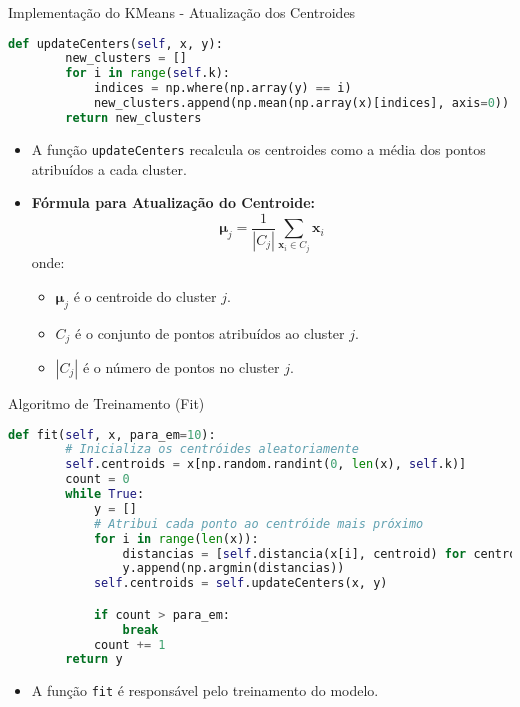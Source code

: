\documentclass{beamer}
\begin{document}
\begin{frame}[fragile]{Implementação do KMeans - Atualização dos Centroides}
\begin{lstlisting}[language=Python]
    def updateCenters(self, x, y):
        new_clusters = []
        for i in range(self.k):
            indices = np.where(np.array(y) == i)
            new_clusters.append(np.mean(np.array(x)[indices], axis=0))
        return new_clusters
\end{lstlisting}
    \vspace{0.3cm}
    \begin{itemize}
        \item A função \texttt{updateCenters} recalcula os centroides como a média dos pontos atribuídos a cada cluster.
    \end{itemize}
    \vspace{0.3cm}
    \begin{itemize}
        \item \textbf{Fórmula para Atualização do Centroide:}
        \[
        \mathbf{\mu}_j = \frac{1}{|C_j|} \sum_{\mathbf{x}_i \in C_j} \mathbf{x}_i
        \]
        onde:
        \begin{itemize}
            \item \( \mathbf{\mu}_j \) é o centroide do cluster \( j \).
            \item \( C_j \) é o conjunto de pontos atribuídos ao cluster \( j \).
            \item \( |C_j| \) é o número de pontos no cluster \( j \).
        \end{itemize}
    \end{itemize}
\end{frame}

\begin{frame}[fragile]{Algoritmo de Treinamento (Fit)}
\begin{lstlisting}[language=Python]
    def fit(self, x, para_em=10):
        # Inicializa os centróides aleatoriamente
        self.centroids = x[np.random.randint(0, len(x), self.k)]
        count = 0
        while True:
            y = []
            # Atribui cada ponto ao centróide mais próximo
            for i in range(len(x)):
                distancias = [self.distancia(x[i], centroid) for centroid in self.centroids]
                y.append(np.argmin(distancias))
            self.centroids = self.updateCenters(x, y)

            if count > para_em:
                break
            count += 1
        return y
\end{lstlisting}
    \vspace{0.3cm}
    \begin{itemize}
        \item A função \texttt{fit} é responsável pelo treinamento do modelo. 
    \end{itemize}
\end{frame}
\end{document}
